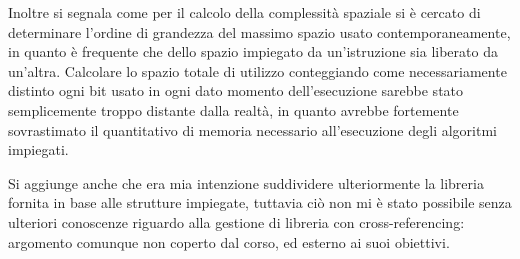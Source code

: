 \documentclass[a4paper,11pt]{Article}
\begin{document}
Inoltre si segnala come per il calcolo della complessità spaziale si è cercato di determinare l'ordine di grandezza del massimo spazio usato contemporaneamente, in quanto è frequente che dello spazio impiegato da un'istruzione sia liberato da un'altra. Calcolare lo spazio totale di utilizzo conteggiando come necessariamente distinto ogni bit usato in ogni dato momento dell'esecuzione sarebbe stato semplicemente troppo distante dalla realtà, in quanto avrebbe fortemente sovrastimato il quantitativo di memoria necessario all'esecuzione degli algoritmi impiegati.

Si aggiunge anche che era mia intenzione suddividere ulteriormente la libreria fornita in base alle strutture impiegate, tuttavia ciò non mi è stato possibile senza ulteriori conoscenze riguardo alla gestione di libreria con cross-referencing: argomento comunque non coperto dal corso, ed esterno ai suoi obiettivi.
\end{document}
